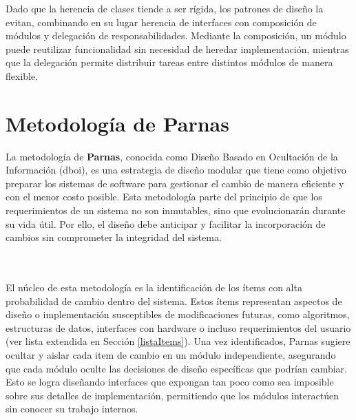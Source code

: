 Dado que la herencia de clases tiende a ser rígida, los patrones de diseño la evitan, combinando en su lugar herencia de interfaces con composición de módulos y delegación de responsabilidades. Mediante la composición, un módulo puede reutilizar funcionalidad sin necesidad de heredar implementación, mientras que la delegación permite distribuir tareas entre distintos módulos de manera flexible.


\section{Metodología de Parnas}
\label{metoParnas}

La metodología de \textbf{Parnas}\cite{Parnas1972}, conocida como Diseño Basado en Ocultación de la Información (\gls{dboi}), es una estrategia de diseño modular que tiene como objetivo preparar los sistemas de software para gestionar el cambio de manera eficiente y con el menor costo posible. Esta metodología parte del principio de que los requerimientos de un sistema no son inmutables, sino que evolucionarán durante su vida útil. Por ello, el diseño debe anticipar y facilitar la incorporación de cambios sin comprometer la integridad del sistema.

\noindent{} 
\\\\
\indent
El núcleo de esta metodología es la identificación de los ítems con alta probabilidad de cambio dentro del sistema. Estos ítems representan aspectos de diseño o implementación susceptibles de modificaciones futuras, como algoritmos, estructuras de datos, interfaces con hardware o incluso requerimientos del usuario (ver lista extendida en Sección \ref{listaItems}). Una vez identificados, Parnas sugiere ocultar y aislar cada item de cambio en un módulo independiente, asegurando que cada módulo oculte las decisiones de diseño específicas que podrían cambiar. Esto se logra diseñando interfaces que expongan tan poco como sea imposible sobre sus detalles de implementación, permitiendo que los módulos interactúen sin conocer su trabajo internos. 

